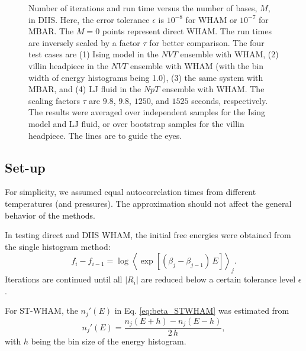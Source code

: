 \documentclass[reprint,aip,jcp,superscriptaddress]{revtex4-1}
\begin{document}
\begin{figure}[h]
  \caption{
    \label{fig:nsnt}
    Number of iterations
    and run time
    versus the number of bases, $M$,
    in DIIS.
    Here, the error tolerance
    $\epsilon$ is $10^{-8}$ for WHAM
    or $10^{-7}$ for MBAR.
    The $M = 0$ points represent direct WHAM.
    The run times are inversely scaled
    by a factor $\tau$
    for better comparison.
    The four test cases are
    (1) Ising model in the $NVT$ ensemble with WHAM,
    (2) villin headpiece in the $NVT$ ensemble with WHAM
    (with the bin width of energy histograms being 1.0),
    (3) the same system with MBAR,
    and
    (4) LJ fluid in the $NpT$ ensemble with WHAM.
    The scaling factors $\tau$ are
    {\color{red} $9.8$, $9.8$, $1250$, and $1525$} seconds,
    respectively.
    The results were averaged
    over independent samples
    for the Ising model and LJ fluid,
    or over bootstrap\cite{
    newman, efron1979, hub2010}
    samples
    for the villin headpiece.
    The lines are to guide the eyes.
  }
\end{figure}





\subsection{\label{sec:results_setup}
Set-up}



For simplicity,
we assumed equal autocorrelation times
from different temperatures (and pressures).
%
The approximation should not affect
the general behavior of the methods.



In testing direct and DIIS WHAM,
the initial free energies were obtained from
the single histogram method:
%
\begin{equation*}
f_i - f_{i-1}
=
\log
\left\langle
  \exp\left[
    (\beta_j - \beta_{j-1}) \, E
  \right]
\right\rangle_j.
\end{equation*}
%
Iterations are continued
until all $|R_i|$ are reduced
below a certain tolerance level $\epsilon$.



For ST-WHAM,
the $n_j'(E)$ in Eq. \eqref{eq:beta_STWHAM}
was estimated from
\begin{equation}
n_j'(E)
=
\frac{ n_j(E + h) - n_j(E - h) }
     { 2 \, h },
\label{eq:dn}
\end{equation}
with $h$ being the bin size
of the energy histogram.
\end{document}
